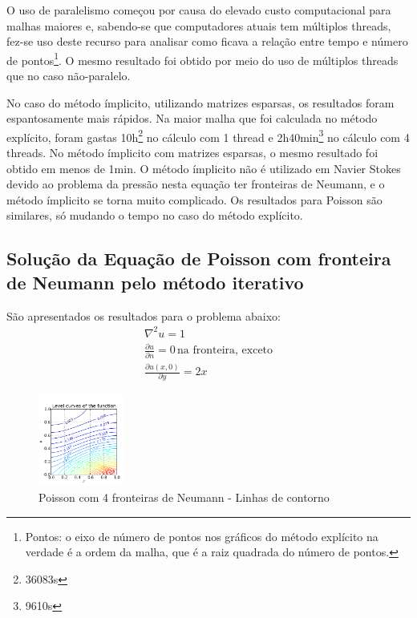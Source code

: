 \documentclass[journal]{IEEEtran}
\begin{document}
O uso de paralelismo começou por causa do elevado custo computacional para malhas maiores e, sabendo-se que computadores atuais tem múltiplos threads, fez-se uso deste recurso para analisar como ficava a relação entre tempo e número de pontos\footnote{Pontos: o eixo de número de pontos nos gráficos do método explícito na verdade é a ordem da malha, que é a raiz quadrada do número de pontos.}. O mesmo resultado foi obtido por meio do uso de múltiplos threads que no caso não-paralelo.

No caso do método ímplicito, utilizando matrizes esparsas, os resultados foram espantosamente mais rápidos. Na maior malha que foi calculada no método explícito, foram gastas 10h\footnote{36083s} no cálculo com 1 thread e 2h40min\footnote{9610s} no cálculo com 4 threads. No método ímplicito com matrizes esparsas, o mesmo resultado foi obtido em menos de 1min. O método ímplicito não é utilizado em Navier Stokes devido ao problema da pressão nesta equação ter fronteiras de Neumann, e o método ímplicito se torna muito complicado. Os resultados para Poisson são similares, só mudando o tempo no caso do método explícito.
\subsection{Solução da Equação de Poisson com fronteira de Neumann pelo método iterativo}
São apresentados os resultados para o problema abaixo:
\begin{eqnarray}
\nabla^2 u = 1\\
\frac{\partial u}{\partial n}=0\,\textrm{na fronteira, exceto}\\
\frac{\partial u(x,0)}{\partial y}=2x
\end{eqnarray}


\begin{figure}[ht!]
\label{poisson_neumann_contorno}
\centering
\includegraphics[width = 0.25\textwidth]{figures/poisson_neumann_02.png}
\caption{Poisson com 4 fronteiras de Neumann - Linhas de contorno}
\end{figure}
\end{document}
